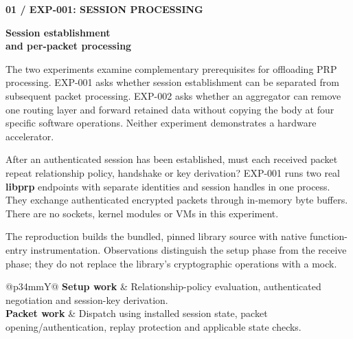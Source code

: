 \documentclass[10pt,a4paper]{article}
\newcommand{\eyebrow}[1]{{\small\bfseries\color{teal}\MakeUppercase{#1}}\par}
\newcommand{\sectionlabel}[1]{\par\vspace{4pt}{\large\bfseries #1}\par}
\begin{document}
\eyebrow{01 / EXP-001: session processing}
\vspace{5pt}
{\fontsize{23}{26}\selectfont\bfseries Session establishment\\and per-packet processing}\par
The two experiments examine complementary prerequisites for offloading PRP processing. EXP-001 asks whether session establishment can be separated from subsequent packet processing. EXP-002 asks whether an aggregator can remove one routing layer and forward retained data without copying the body at four specific software operations. Neither experiment demonstrates a hardware accelerator.
\sectionlabel{Question and execution environment}
After an authenticated session has been established, must each received packet repeat relationship policy, handshake or key derivation? EXP-001 runs two real \textbf{libprp} endpoints with separate identities and session handles in one process. They exchange authenticated encrypted packets through in-memory byte buffers. There are no sockets, kernel modules or VMs in this experiment.
\begin{center}
\end{center}
\sectionlabel{What is observed}
The reproduction builds the bundled, pinned library source with native function-entry instrumentation. Observations distinguish the setup phase from the receive phase; they do not replace the library's cryptographic operations with a mock.
\begin{tabularx}{\linewidth}{@{}p{34mm}Y@{}}\toprule
\textbf{Setup work} & Relationship-policy evaluation, authenticated negotiation and session-key derivation.\\[5pt]
\textbf{Packet work} & Dispatch using installed session state, packet opening/authentication, replay protection and applicable state checks.\\\bottomrule
\end{tabularx}
\end{document}
